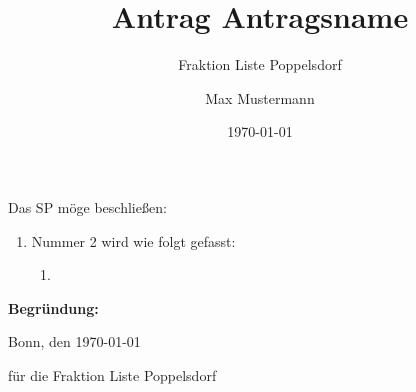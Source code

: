 \documentclass[
 DIV=14,
 draft,
]{antrag} %
\title{Antrag Antragsname}
\author{Fraktion Liste Poppelsdorf}
\date{\today}
\begin{document}
\maketitle

Das SP möge beschließen:

\begin{linenumbers}
    \blindtext

    \begin{enumerate}
        \item Nummer 2 wird wie folgt gefasst:
            \begin{vtext}
                \begin{enumerate}[1.,start=2]
                    \item \blindtext
                \end{enumerate}
            \end{vtext}
    \end{enumerate}
\end{linenumbers}

\vspace{1em}
\textbf{Begründung:}\par

\blindtext

\par\vspace{1em}
Bonn, den \today
\begin{multicols}{2}
\raggedcolumns %
\signature{Max Mustermann}{für die Fraktion Liste Poppelsdorf}
\end{multicols}
\end{document}

